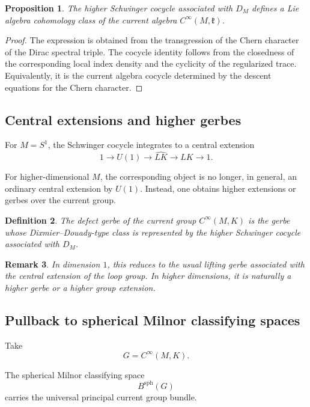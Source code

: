 \documentclass[11pt]{amsart}
\newtheorem{definition}{Definition}[section]
\newtheorem{proposition}[definition]{Proposition}
\newtheorem{remark}[definition]{Remark}
\begin{document}
\begin{proposition}
The higher Schwinger cocycle associated with \(D_M\) defines a Lie algebra cohomology class of the current algebra \(C^\infty(M,\mathfrak k)\).
\end{proposition}

\begin{proof}
The expression is obtained from the transgression of the Chern character of the Dirac spectral triple. The cocycle identity follows from the closedness of the corresponding local index density and the cyclicity of the regularized trace. Equivalently, it is the current algebra cocycle determined by the descent equations for the Chern character.
\end{proof}

\subsection{Central extensions and higher gerbes}

For \(M=S^1\), the Schwinger cocycle integrates to a central extension
\[
1\to U(1)\to \widehat{LK}\to LK\to 1.
\]

For higher-dimensional \(M\), the corresponding object is no longer, in general, an ordinary central extension by \(U(1)\). Instead, one obtains higher extensions or gerbes over the current group.

\begin{definition}
The defect gerbe of the current group \(C^\infty(M,K)\) is the gerbe whose Dixmier--Douady-type class is represented by the higher Schwinger cocycle associated with \(D_M\).
\end{definition}

\begin{remark}
In dimension \(1\), this reduces to the usual lifting gerbe associated with the central extension of the loop group. In higher dimensions, it is naturally a higher gerbe or a higher group extension.
\end{remark}

\subsection{Pullback to spherical Milnor classifying spaces}

Take
\[
G=C^\infty(M,K).
\]

The spherical Milnor classifying space
\[
B^{\mathrm{sph}}(G)
\]
carries the universal principal current group bundle.
\end{document}
